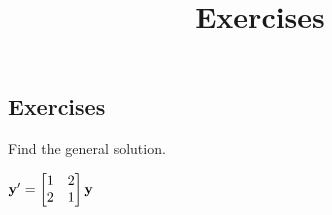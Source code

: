 \documentclass{ximera}
\title{Exercises} \license{CC BY-NC-SA 4.0}
\begin{document}
\begin{abstract}
\end{abstract}
\maketitle

\begin{onlineOnly}
\section*{Exercises}
\end{onlineOnly}




\begin{problem}\label{exer:10.4.1} 
Find the general solution.

$ {\bf y}'=
\begin{bmatrix} 1&2\\2&1\end{bmatrix}{\bf y}$
\end{problem}
\end{document}
